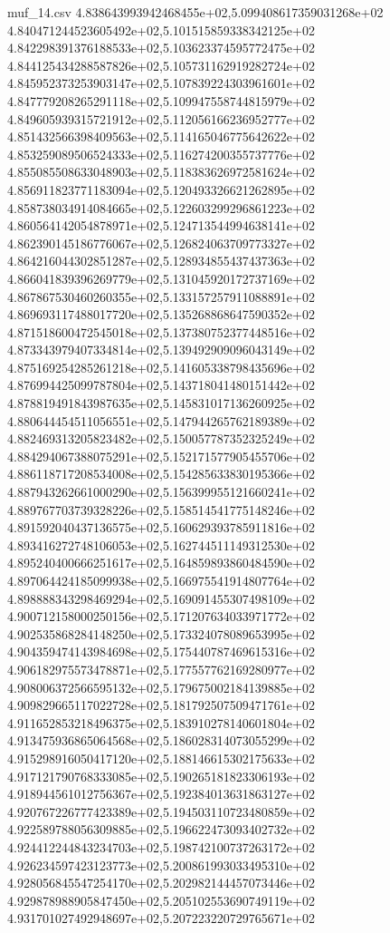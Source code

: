 \begin{filecontents*}{muf_14.csv}
4.838643993942468455e+02,5.099408617359031268e+02
4.840471244523605492e+02,5.101515859338342125e+02
4.842298391376188533e+02,5.103623374595772475e+02
4.844125434288587826e+02,5.105731162919282724e+02
4.845952373253903147e+02,5.107839224303961601e+02
4.847779208265291118e+02,5.109947558744815979e+02
4.849605939315721912e+02,5.112056166236952777e+02
4.851432566398409563e+02,5.114165046775642622e+02
4.853259089506524333e+02,5.116274200355737776e+02
4.855085508633048903e+02,5.118383626972581624e+02
4.856911823771183094e+02,5.120493326621262895e+02
4.858738034914084665e+02,5.122603299296861223e+02
4.860564142054878971e+02,5.124713544994638141e+02
4.862390145186776067e+02,5.126824063709773327e+02
4.864216044302851287e+02,5.128934855437437363e+02
4.866041839396269779e+02,5.131045920172737169e+02
4.867867530460260355e+02,5.133157257911088891e+02
4.869693117488017720e+02,5.135268868647590352e+02
4.871518600472545018e+02,5.137380752377448516e+02
4.873343979407334814e+02,5.139492909096043149e+02
4.875169254285261218e+02,5.141605338798435696e+02
4.876994425099787804e+02,5.143718041480151442e+02
4.878819491843987635e+02,5.145831017136260925e+02
4.880644454511056551e+02,5.147944265762189389e+02
4.882469313205823482e+02,5.150057787352325249e+02
4.884294067388075291e+02,5.152171577905455706e+02
4.886118717208534008e+02,5.154285633830195366e+02
4.887943262661000290e+02,5.156399955121660241e+02
4.889767703739328226e+02,5.158514541775148246e+02
4.891592040437136575e+02,5.160629393785911816e+02
4.893416272748106053e+02,5.162744511149312530e+02
4.895240400666251617e+02,5.164859893860484590e+02
4.897064424185099938e+02,5.166975541914807764e+02
4.898888343298469294e+02,5.169091455307498109e+02
4.900712158000250156e+02,5.171207634033971772e+02
4.902535868284148250e+02,5.173324078089653995e+02
4.904359474143984698e+02,5.175440787469615316e+02
4.906182975573478871e+02,5.177557762169280977e+02
4.908006372566595132e+02,5.179675002184139885e+02
4.909829665117022728e+02,5.181792507509471761e+02
4.911652853218496375e+02,5.183910278140601804e+02
4.913475936865064568e+02,5.186028314073055299e+02
4.915298916050417120e+02,5.188146615302175633e+02
4.917121790768333085e+02,5.190265181823306193e+02
4.918944561012756367e+02,5.192384013631863127e+02
4.920767226777423389e+02,5.194503110723480859e+02
4.922589788056309885e+02,5.196622473093402732e+02
4.924412244843234703e+02,5.198742100737263172e+02
4.926234597423123773e+02,5.200861993033495310e+02
4.928056845547254170e+02,5.202982144457073446e+02
4.929878988905847450e+02,5.205102553690749119e+02
4.931701027492948697e+02,5.207223220729765671e+02

\end{filecontents*}
